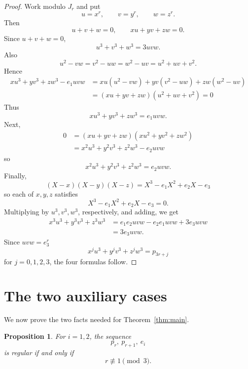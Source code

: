 \documentclass[preprint,12pt]{elsarticle}
\newtheorem{proposition}[theorem]{Proposition}
\begin{document}
\begin{proof}
Work modulo $J_r$ and put
$$
u=x^r,\qquad v=y^r,\qquad w=z^r.
$$
Then
$$
u+v+w=0,\qquad xu+yv+zw=0.
$$
Since $u+v+w=0$,
$$
u^3+v^3+w^3=3uvw.
$$
Also
$$
u^2-vw=v^2-uw=w^2-uv=u^2+uv+v^2.
$$
Hence
\begin{align*}
xu^3+yv^3+zw^3-e_1uvw
&=xu(u^2-vw)+yv(v^2-uw)+zw(w^2-uv)\\
&=(xu+yv+zw)(u^2+uv+v^2)=0
\end{align*}
Thus
$$
xu^3+yv^3+zw^3=e_1uvw.
$$
Next,
\begin{align*}
0&=(xu+yv+zw)(xu^2+yv^2+zw^2)\\
&=x^2u^3+y^2v^3+z^2w^3-e_2uvw
\end{align*}
so
$$
x^2u^3+y^2v^3+z^2w^3=e_2uvw.
$$
Finally,
$$
(X-x)(X-y)(X-z)
=
X^3-e_1X^2+e_2X-e_3
$$
so each of $x,y,z$ satisfies
$$
X^3-e_1X^2+e_2X-e_3=0.
$$
Multiplying by $u^3,v^3,w^3$, respectively, and adding, we get
$$
\begin{aligned}
x^3u^3+y^3v^3+z^3w^3
&=e_1e_2uvw-e_2e_1uvw+3e_3uvw\\
&=3e_3uvw.
\end{aligned}
$$
Since $uvw=e_3^r$
$$
x^ju^3+y^jv^3+z^jw^3=p_{3r+j}
$$
for $j=0,1,2,3$, the four formulas follow.
\end{proof}

\section{The two auxiliary cases}

We now prove the two facts needed for Theorem~\ref{thm:main}.

\begin{proposition}\label{prop:e1e2}
For $i=1,2$, the sequence
$$
p_r,\ p_{r+1},\ e_i
$$
is regular if and only if
$$
r\not\equiv1\pmod3.
$$
\end{proposition}
\end{document}
